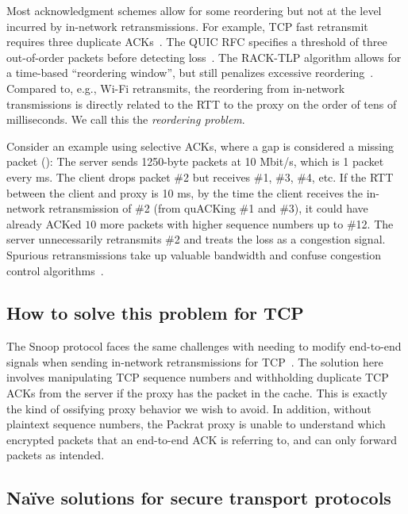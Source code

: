 

Most acknowledgment schemes allow for some reordering but not at the level
incurred by in-network retransmissions. For example, TCP fast retransmit requires
three duplicate ACKs~\cite{rfc5681tcp}. The QUIC RFC specifies a threshold of three
out-of-order packets before detecting loss~\cite{rfc9002quic}. The RACK-TLP algorithm
allows for a time-based ``reordering window'', but still penalizes excessive
reordering~\cite{rfc8985}. Compared to, e.g., Wi-Fi retransmits, the
reordering from in-network transmissions is directly related to the RTT to
the proxy on the order of tens of milliseconds.
We call this the \textit{reordering problem}.

Consider an example using selective ACKs, where a gap is considered a missing
packet (): The server sends 1250-byte packets at 10 Mbit/s,
which is 1 packet every ms. The client drops packet \#2 but
receives \#1, \#3, \#4, etc. If the RTT between the client and proxy is 10 ms,
by the time the client receives the in-network retransmission of \#2 (from
quACKing \#1 and \#3), it could
have already ACKed $10$ more packets with higher sequence
numbers up to \#12. The server unnecessarily retransmits \#2 and treats the
loss as a congestion signal.
Spurious retransmissions take up valuable bandwidth and confuse congestion
control algorithms~\cite{leung2007overview}.

\subsection{How to solve this problem for TCP}
\label{sec:packrat:problem:tcp}

The Snoop protocol faces the same challenges with needing to modify end-to-end
signals when sending in-network retransmissions for TCP~\cite
{balakrishnan1995snoop}. The solution here involves manipulating TCP sequence
numbers and withholding duplicate TCP
ACKs from the server if the proxy has the packet in the cache. This is exactly
the kind of ossifying proxy behavior we wish to avoid. In addition, without
plaintext sequence numbers, the Packrat proxy is unable to understand which
encrypted packets that an end-to-end ACK is referring to, and can only
forward packets as intended.

\subsection{Na\"ive solutions for secure transport protocols}
\label{sec:packrat:problem:naive}

